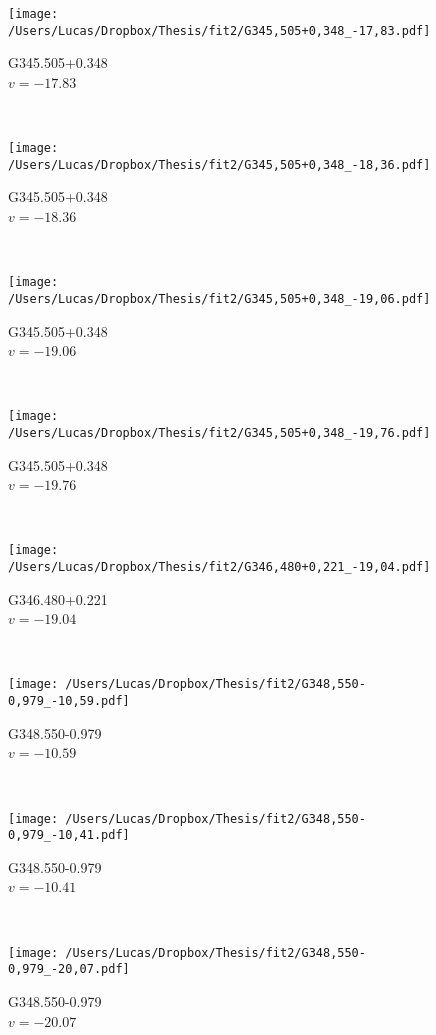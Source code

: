 \begin{figure*}[t]\ContinuedFloat
	\centering
	\begin{subfigure}[t]{0.3\textwidth}
		\texttt{[image: /Users/Lucas/Dropbox/Thesis/fit2/G345,505+0,348\_-17,83.pdf]}
		\caption[]{G345.505+0.348\\$v=-17.83$\,\kms}
	\end{subfigure}
	~
	\begin{subfigure}[t]{0.3\textwidth}
		\texttt{[image: /Users/Lucas/Dropbox/Thesis/fit2/G345,505+0,348\_-18,36.pdf]}
		\caption[]{G345.505+0.348\\$v=-18.36$\,\kms}
	\end{subfigure}
	~
	\begin{subfigure}[t]{0.3\textwidth}
		\texttt{[image: /Users/Lucas/Dropbox/Thesis/fit2/G345,505+0,348\_-19,06.pdf]}
		\caption[]{G345.505+0.348\\$v=-19.06$\,\kms}
	\end{subfigure}
	~
	\begin{subfigure}[t]{0.3\textwidth}
		\texttt{[image: /Users/Lucas/Dropbox/Thesis/fit2/G345,505+0,348\_-19,76.pdf]}
		\caption[]{G345.505+0.348\\$v=-19.76$\,\kms}
	\end{subfigure}
	~
	\begin{subfigure}[t]{0.3\textwidth}
		\texttt{[image: /Users/Lucas/Dropbox/Thesis/fit2/G346,480+0,221\_-19,04.pdf]}
		\caption[]{G346.480+0.221\\$v=-19.04$\,\kms}
	\end{subfigure}
	~
	\begin{subfigure}[t]{0.3\textwidth}
		\texttt{[image: /Users/Lucas/Dropbox/Thesis/fit2/G348,550-0,979\_-10,59.pdf]}
		\caption[]{G348.550-0.979\\$v=-10.59$\,\kms}
	\end{subfigure}
	~
	\begin{subfigure}[t]{0.3\textwidth}
		\texttt{[image: /Users/Lucas/Dropbox/Thesis/fit2/G348,550-0,979\_-10,41.pdf]}
		\caption[]{G348.550-0.979\\$v=-10.41$\,\kms}
	\end{subfigure}
	~
	\begin{subfigure}[t]{0.3\textwidth}
		\texttt{[image: /Users/Lucas/Dropbox/Thesis/fit2/G348,550-0,979\_-20,07.pdf]}
		\caption[]{G348.550-0.979\\$v=-20.07$\,\kms}

\end{subfigure}
\end{figure*}
